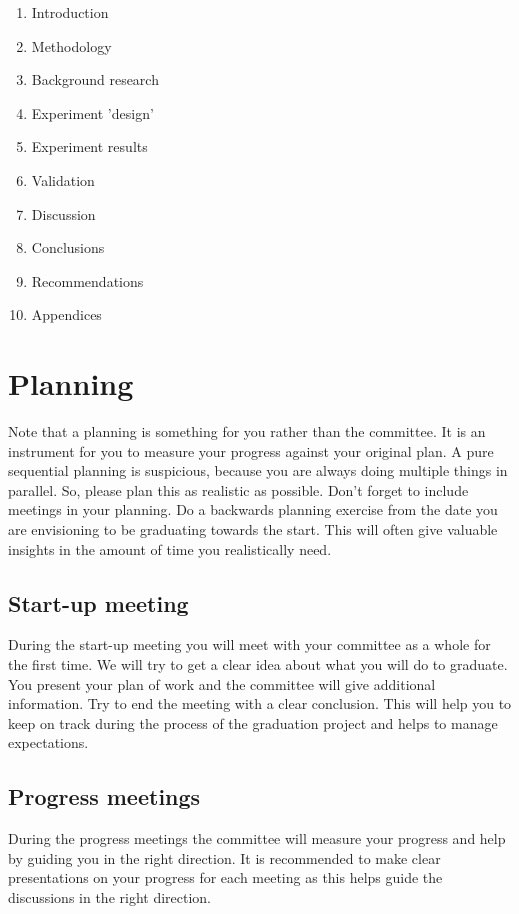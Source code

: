 \documentclass{latex-format/stylesheets/BEMNextstyle}
\begin{document}
\begin{enumerate}
\item Introduction
\item Methodology
\item Background research
\item Experiment 'design'
\item Experiment results
\item Validation
\item Discussion
\item Conclusions
\item Recommendations
\item Appendices
\end{enumerate}

\section*{Planning}
\label{sec:planning}
Note that a planning is something for you rather than the committee. It is an instrument for you to measure your progress against your original plan. A pure sequential planning is suspicious, because you are always doing multiple things in parallel. So, please plan this as realistic as possible. Don't forget to include meetings in your planning. Do a backwards planning exercise from the date you are envisioning to be graduating towards the start. This will often give valuable insights in the amount of time you realistically need.

\subsection*{Start-up meeting}
During the start-up meeting you will meet with your committee as a whole for the first time. We will try to get a clear idea about what you will do to graduate. You present your plan of work and the committee will give additional information. Try to end the meeting with a clear conclusion. This will help you to keep on track during the process of the graduation project and helps to manage expectations.

\subsection*{Progress meetings}
During the progress meetings the committee will measure your progress and help by guiding you in the right direction. It is recommended to make clear presentations on your progress for each meeting as this helps guide the discussions in the right direction.
\end{document}
